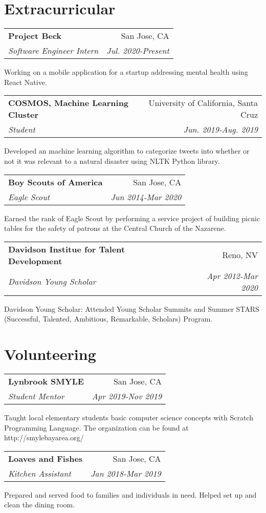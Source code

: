 \documentclass[letterpaper,11pt]{article}
\makeatletter
\newcommand{\resumeSubheading}[4]{
  \vspace{0.25em}
  \begin{tabular*}{0.97\textwidth}[t]{l@{\extracolsep{\fill}}r}
    \textbf{#1} & #2 \\
    \textit{\small#3} & \textit{\small #4} \\
  \end{tabular*}\vspace{0.25em}
}
\makeatother
\begin{document}
\section{Extracurricular}

\resumeSubheading{Project Beck}{San Jose, CA}{Software Engineer Intern}{Jul. 2020-Present}

Working on a mobile application for a startup addressing mental health using React Native.

\resumeSubheading{COSMOS, Machine Learning Cluster}
{University of California, Santa Cruz}{Student}{Jun. 2019-Aug. 2019}

Developed an machine learning algorithm to categorize tweets into whether or not it was relevant to a natural disaster using NLTK Python library.

\resumeSubheading{Boy Scouts of America}
{San Jose, CA}{Eagle Scout}{Jun 2014-Mar 2020}

Earned the rank of Eagle Scout by performing a service project of building picnic tables for the safety of patrons at the Central Church of the Nazarene.

\resumeSubheading{Davidson Institue for Talent Development}
{Reno, NV}{Davidson Young Scholar}{Apr 2012-Mar 2020}

Davidson Young Scholar: Attended Young Scholar Summits and Summer STARS (Successful, Talented, Ambitious, Remarkable, Scholars) Program.

\section{Volunteering}

\resumeSubheading{Lynbrook SMYLE}
{San Jose, CA}{Student Mentor}{Apr 2019-Nov 2019}

Taught local elementary students basic computer science concepts with Scratch Programming Language. The organization can be found at http://smylebayarea.org/

\resumeSubheading{Loaves and Fishes}
{San Jose, CA}{Kitchen Assistant}{Jan 2018-Mar 2019}

Prepared and served food to families and individuals in need. Helped set up and clean the dining room.
\end{document}
